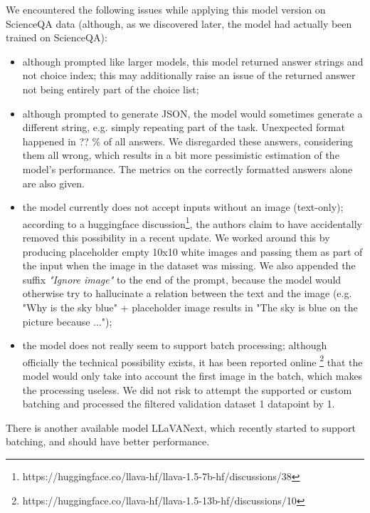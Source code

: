 \documentclass{article}
\begin{document}
We encountered the following issues while applying this model version on ScienceQA data (although, as we discovered later, the model had actually been trained on ScienceQA):
\begin{itemize}
	\item although prompted like larger models, this model returned answer strings and not choice index; this may additionally raise an issue of the returned answer not being entirely part of the choice list;
	\item although prompted to generate JSON, the model would sometimes generate a different string, e.g. simply repeating part of the task. Unexpected format happened in ?? \% of all answers. We disregarded these answers, considering them all wrong, which results in a bit more pessimistic estimation of the model's performance. The metrics on the correctly formatted answers alone are also given. 
	\item the model currently does not accept inputs without an image (text-only); according to a huggingface discussion\footnote{https://huggingface.co/llava-hf/llava-1.5-7b-hf/discussions/38}, the authors claim to have accidentally removed this possibility in a recent update. We worked around this by producing placeholder empty 10x10 white images and passing them as part of the input when the image in the dataset was missing. We also appended the suffix \textit{"Ignore image"} to the end of the prompt, because the model would otherwise try to hallucinate a relation between the text and the image (e.g. "Why is the sky blue" + placeholder image results in "The sky is blue on the picture because ...");
	\item the model does not really seem to support batch processing; although officially the technical possibility exists, it has been reported online \footnote{https://huggingface.co/llava-hf/llava-1.5-13b-hf/discussions/10} that the model would only take into account the first image in the batch, which makes the processing useless. We did not risk to attempt the supported or custom batching and processed the filtered validation dataset 1 datapoint by 1. 
\end{itemize}

There is another available model LLaVANext, which recently started to support batching, and should have better performance. 

\end{document}
